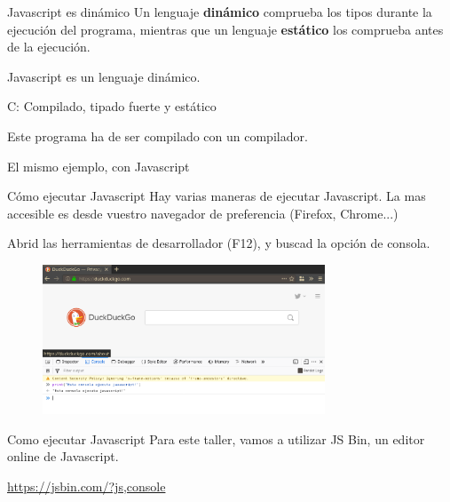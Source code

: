 \documentclass{beamer}
\begin{document}
    
    
\begin{frame}{Javascript es dinámico}
        \pause
        Un lenguaje \textbf{dinámico} comprueba los tipos durante la ejecución del programa, mientras que un lenguaje \textbf{estático} los comprueba antes de la ejecución.\pause
        \centering
        
        Javascript es un lenguaje dinámico.
\end{frame}
\begin{frame}[fragile]{C: Compilado, tipado fuerte y estático}\pause
        \centering
        
        Este programa ha de ser compilado con un compilador.
\end{frame}

\begin{frame}[fragile]{El mismo ejemplo, con Javascript}\pause
        \centering
\end{frame}

\begin{frame}{Cómo ejecutar Javascript}\pause
    Hay varias maneras de ejecutar Javascript. La mas accesible es desde vuestro navegador de preferencia (Firefox, Chrome...)\pause
    
    Abrid las herramientas de desarrollador (F12), y buscad la opción de consola.
    \begin{figure}
        \centering
        \includegraphics[width=0.75\textwidth]{images/firefox_dev.png}
    \end{figure}
\end{frame}

\begin{frame}{Como ejecutar Javascript}
Para este taller, vamos a utilizar JS Bin, un editor online de Javascript.
    
\centering\url{https://jsbin.com/?js,console}
\end{frame}
\end{document}
